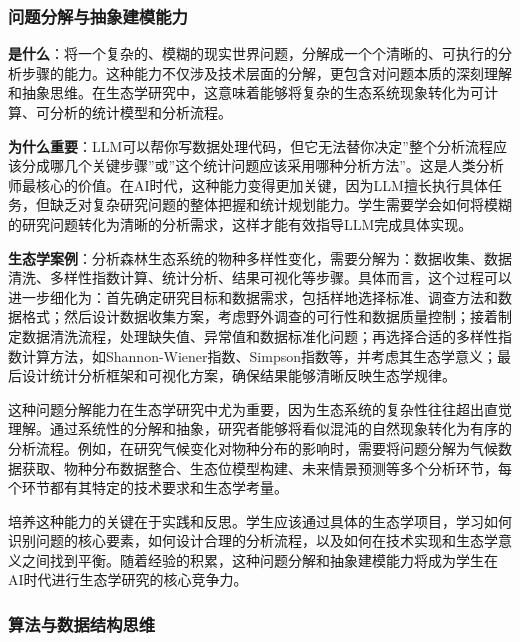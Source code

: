 \documentclass[
  twoside]{book}
\begin{document}
\hypertarget{ux95eeux9898ux5206ux89e3ux4e0eux62bdux8c61ux5efaux6a21ux80fdux529b}{%
\subsubsection{问题分解与抽象建模能力}\label{ux95eeux9898ux5206ux89e3ux4e0eux62bdux8c61ux5efaux6a21ux80fdux529b}}

\textbf{是什么}：将一个复杂的、模糊的现实世界问题，分解成一个个清晰的、可执行的分析步骤的能力。这种能力不仅涉及技术层面的分解，更包含对问题本质的深刻理解和抽象思维。在生态学研究中，这意味着能够将复杂的生态系统现象转化为可计算、可分析的统计模型和分析流程。

\textbf{为什么重要}：LLM可以帮你写数据处理代码，但它无法替你决定''整个分析流程应该分成哪几个关键步骤''或''这个统计问题应该采用哪种分析方法''。这是人类分析师最核心的价值。在AI时代，这种能力变得更加关键，因为LLM擅长执行具体任务，但缺乏对复杂研究问题的整体把握和统计规划能力。学生需要学会如何将模糊的研究问题转化为清晰的分析需求，这样才能有效指导LLM完成具体实现。

\textbf{生态学案例}：分析森林生态系统的物种多样性变化，需要分解为：数据收集、数据清洗、多样性指数计算、统计分析、结果可视化等步骤。具体而言，这个过程可以进一步细化为：首先确定研究目标和数据需求，包括样地选择标准、调查方法和数据格式；然后设计数据收集方案，考虑野外调查的可行性和数据质量控制；接着制定数据清洗流程，处理缺失值、异常值和数据标准化问题；再选择合适的多样性指数计算方法，如Shannon-Wiener指数、Simpson指数等，并考虑其生态学意义；最后设计统计分析框架和可视化方案，确保结果能够清晰反映生态学规律。

这种问题分解能力在生态学研究中尤为重要，因为生态系统的复杂性往往超出直觉理解。通过系统性的分解和抽象，研究者能够将看似混沌的自然现象转化为有序的分析流程。例如，在研究气候变化对物种分布的影响时，需要将问题分解为气候数据获取、物种分布数据整合、生态位模型构建、未来情景预测等多个分析环节，每个环节都有其特定的技术要求和生态学考量。

培养这种能力的关键在于实践和反思。学生应该通过具体的生态学项目，学习如何识别问题的核心要素，如何设计合理的分析流程，以及如何在技术实现和生态学意义之间找到平衡。随着经验的积累，这种问题分解和抽象建模能力将成为学生在AI时代进行生态学研究的核心竞争力。

\hypertarget{ux7b97ux6cd5ux4e0eux6570ux636eux7ed3ux6784ux601dux7ef4}{%
\subsubsection{算法与数据结构思维}\label{ux7b97ux6cd5ux4e0eux6570ux636eux7ed3ux6784ux601dux7ef4}}
\end{document}
